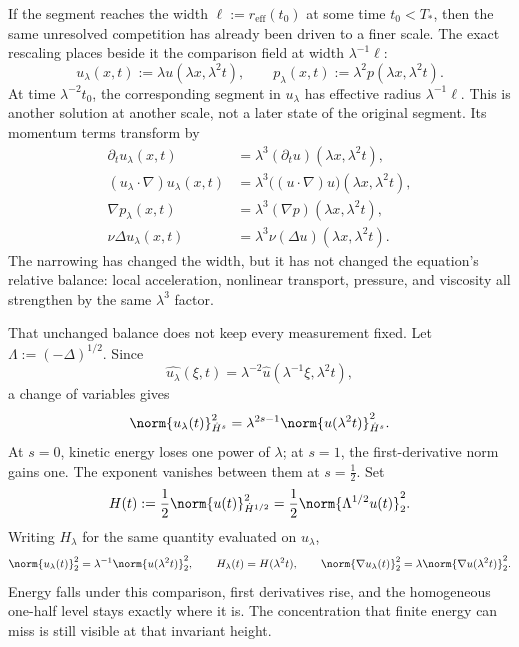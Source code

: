 
If the segment reaches the width \(\ell:=r_{\mathrm{eff}}(t_0)\) at some time \(t_0<T_*\), then the same unresolved competition has already been driven to a finer scale. The exact \NavierStokes{} rescaling places beside it the comparison field at width \(\lambda^{-1}\ell\):
\[
  u_\lambda(x,t)
  :=
  \lambda u(\lambda x,\lambda^2t),
  \qquad
  p_\lambda(x,t)
  :=
  \lambda^2p(\lambda x,\lambda^2t).
\]
At time \(\lambda^{-2}t_0\), the corresponding segment in \(u_\lambda\) has effective radius \(\lambda^{-1}\ell\). This is another solution at another scale, not a later state of the original segment. Its momentum terms transform by
\[
\begin{aligned}
  \partial_tu_\lambda(x,t)
  &=
  \lambda^3(\partial_tu)(\lambda x,\lambda^2t),
  \\
  (u_\lambda\cdot\nabla)u_\lambda(x,t)
  &=
  \lambda^3\bigl((u\cdot\nabla)u\bigr)(\lambda x,\lambda^2t),
  \\
  \nabla p_\lambda(x,t)
  &=
  \lambda^3(\nabla p)(\lambda x,\lambda^2t),
  \\
  \nu\Delta u_\lambda(x,t)
  &=
  \lambda^3\nu(\Delta u)(\lambda x,\lambda^2t).
\end{aligned}
\]
The narrowing has changed the width, but it has not changed the equation's relative balance: local acceleration, nonlinear transport, pressure, and viscosity all strengthen by the same \(\lambda^3\) factor.


That unchanged balance does not keep every measurement fixed. Let \(\Lambda:=(-\Delta)^{1/2}\). Since
\[
  \widehat{u_\lambda}(\xi,t)
  =
  \lambda^{-2}\widehat u(\lambda^{-1}\xi,\lambda^2t),
\]
a change of variables gives
\[
  \norm{u_\lambda(t)}_{\dot H^s}^2
  =
  \lambda^{2s-1}
  \norm{u(\lambda^2t)}_{\dot H^s}^2.
\]
At \(s=0\), kinetic energy loses one power of \(\lambda\); at \(s=1\), the first-derivative norm gains one. The exponent vanishes between them at \(s=\tfrac12\). Set
\[
  H(t)
  :=
  \frac12\norm{u(t)}_{\dot H^{1/2}}^2
  =
  \frac12\norm{\Lambda^{1/2}u(t)}_2^2.
\]
Writing \(H_\lambda\) for the same quantity evaluated on \(u_\lambda\),
\[
  \norm{u_\lambda(t)}_2^2
  =
  \lambda^{-1}\norm{u(\lambda^2t)}_2^2,
  \qquad
  H_\lambda(t)=H(\lambda^2t),
  \qquad
  \norm{\nabla u_\lambda(t)}_2^2
  =
  \lambda\norm{\nabla u(\lambda^2t)}_2^2.
\]
Energy falls under this comparison, first derivatives rise, and the homogeneous one-half level stays exactly where it is. The concentration that finite energy can miss is still visible at that invariant height.

